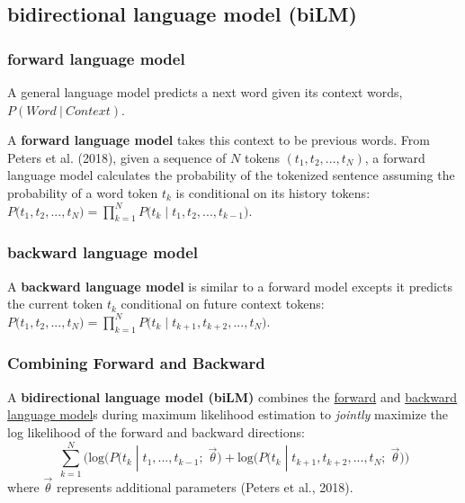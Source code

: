 




\subsection{bidirectional language model (biLM)} \label{sec:BidirectionalLM}

\subsubsection{forward language model} \label{sec:ForwardLM}

A general language model predicts a next word given its context words, $P(\textit{Word} \: | \: \textit{Context})$. 

A \textbf{forward language model} takes this context to be previous words. From Peters et al. (2018), given a sequence of $N$ tokens $(t_1, t_2, ..., t_N)$, a forward language model calculates the probability of the tokenized sentence assuming the probability of a word token $t_k$ is conditional on its history tokens: $P \Big(t_1, t_2, ..., t_N \Big) = \prod_{k=1}^N P \Big(t_k \; | \; t_1, t_2, ..., t_{k-1} \Big)$.

\subsubsection{backward language model} \label{sec:BackwardLM}

A \textbf{backward language model} is similar to a forward model excepts it predicts the current token $t_k$ conditional on future context tokens: $P \Big(t_1, t_2, ..., t_N \Big) = \prod_{k=1}^N P \Big(t_k \; | \; t_{k+1}, t_{k+2}, ..., t_N \Big)$.

\subsubsection{Combining Forward and Backward}

A \textbf{bidirectional language model (biLM)} combines the \hyperref[sec:ForwardLM]{forward} and \hyperref[sec:BackwardLM]{backward language model}s during maximum likelihood estimation to \emph{jointly} maximize the log likelihood of the forward and backward directions: 
\begin{equation}
\sum_{k=1}^N \Big( \text{log} \Big( P \Big(t_k \; | \; t_1,...,t_{k-1}; \; \overrightarrow{\theta} \Big) + \text{log} \Big( P \Big(t_k \; | \; t_{k+1}, t_{k+2}, ..., t_N; \; \overrightarrow{\theta} \Big) \Big)
\label{eq:BiLMLoss}
\end{equation}
where $\overrightarrow{\theta}$ represents additional parameters (Peters et al., 2018). 


